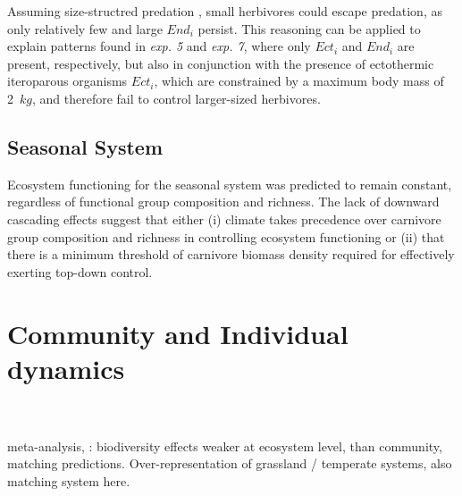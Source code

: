 Assuming size-structred predation \citep{Williams2010}, small herbivores could escape predation, as only relatively few and large $End_i$ persist. 
This reasoning can be applied to explain patterns found in \textit{exp. 5} and \textit{exp. 7}, where only $Ect_i$ and $End_i$ are present, respectively, but also in conjunction with the presence of ectothermic iteroparous organisms  $Ect_i$, which are constrained by a maximum body mass of 2~$kg$, and therefore fail to control larger-sized herbivores. 
\subsection{Seasonal System}
Ecosystem functioning for the seasonal system was predicted to remain constant, regardless of functional group composition and richness. The lack of downward cascading effects suggest that either (i) climate takes precedence over carnivore group composition and richness in controlling ecosystem functioning  or (ii) that there is a minimum threshold of carnivore biomass density required for effectively exerting top-down control.

\section{Community and Individual dynamics}
\\\\
meta-analysis, \cite{Balvanera2006}: biodiversity effects weaker at ecosystem level, than community, matching predictions.  Over-representation of grassland / temperate systems, also matching system here.

